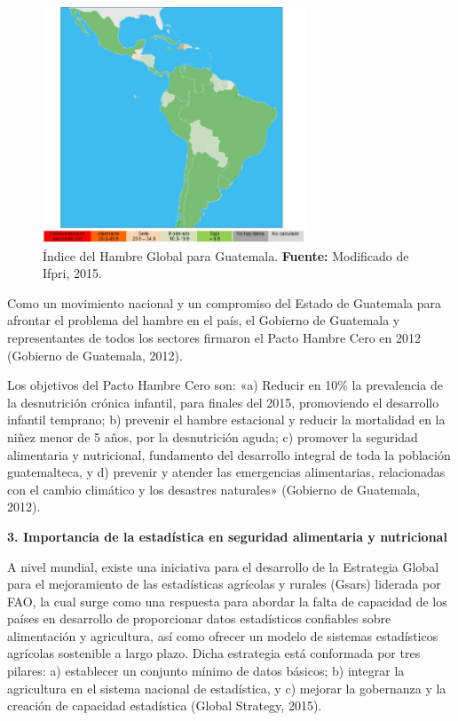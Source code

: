 \begin{figure}
		\centering
	\includegraphics[width=0.7\textwidth]{figura2}
	\caption{Índice del Hambre Global para Guatemala. \textbf{Fuente:} Modificado de Ifpri, 2015.}
	\label{figura2}
\end{figure}


Como un movimiento nacional y un compromiso del Estado de Guatemala para afrontar el problema del hambre en el país, el Gobierno de Guatemala y representantes de todos los sectores firmaron el Pacto Hambre Cero en 2012 (Gobierno de Guatemala, 2012). 

Los objetivos del Pacto Hambre Cero son: «a) Reducir en 10\% la prevalencia de la desnutrición crónica infantil, para finales del 2015, promoviendo el desarrollo infantil temprano; b) prevenir el hambre estacional y reducir la mortalidad en la niñez menor de 5 años, por la desnutrición aguda; c) promover la seguridad alimentaria y nutricional, fundamento del desarrollo integral de toda la población guatemalteca, y d) prevenir y atender las emergencias alimentarias, relacionadas con el cambio climático y los desastres naturales» (Gobierno de Guatemala, 2012). 


\noindent\textbf{3.	Importancia de la estadística en seguridad alimentaria y nutricional}

A nivel mundial, existe una iniciativa para el desarrollo de la Estrategia Global para el mejoramiento de las estadísticas agrícolas y rurales (Gsars) liderada por FAO, la cual surge como una respuesta para abordar la falta de capacidad de los países en desarrollo de proporcionar datos estadísticos confiables sobre alimentación y agricultura, así como ofrecer un modelo de sistemas estadísticos agrícolas sostenible a largo plazo. Dicha estrategia está conformada por tres pilares: a) establecer un conjunto mínimo de datos básicos; b) integrar la agricultura en el sistema nacional de estadística, y c) mejorar la gobernanza y la creación de capacidad estadística (Global Strategy, 2015).
